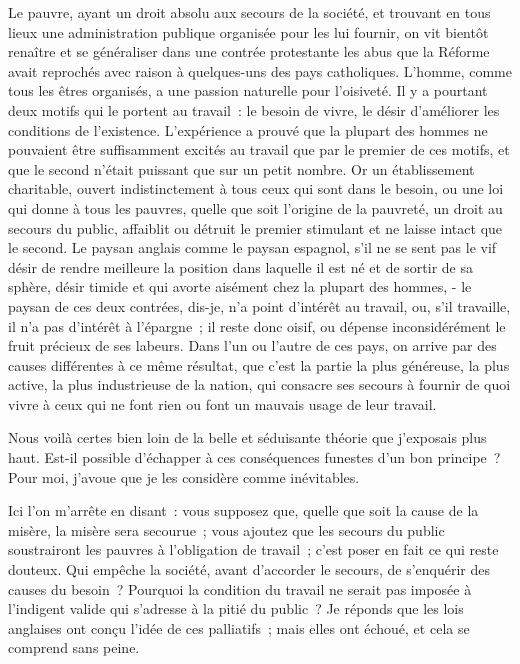 \documentclass[french,twoside]{book} %
\begin{document}
Le pauvre, ayant un droit absolu aux secours de la société, et trouvant en tous lieux une administration publique organisée pour les lui fournir, on vit bientôt renaître et se généraliser dans une contrée protestante les abus que la Réforme avait reprochés avec raison à quelques-uns des pays catholiques. L'homme, comme tous les êtres organisés, a une passion naturelle pour l’oisiveté. Il y a pourtant deux motifs qui le portent au travail : le besoin de vivre, le désir d’améliorer les conditions de l’existence. L’expérience a prouvé que la plupart des hommes ne pouvaient être suffisamment excités au travail que par le premier de ces motifs, et que le second n’était puissant que sur un petit nombre. Or un établissement charitable, ouvert indistinctement à tous ceux qui sont dans le besoin, ou une loi qui donne à tous les pauvres, quelle que soit l’origine de la pauvreté, un droit au secours du public, affaiblit ou détruit le premier stimulant et ne laisse intact que le second. Le paysan anglais comme le paysan espagnol, s’il ne se sent pas le vif désir de rendre meilleure la position dans laquelle il est né et de sortir de sa sphère, désir timide et qui avorte aisément chez la plupart des hommes, - le paysan de ces deux contrées, dis-je, n’a point d’intérêt au travail, ou, s’il travaille, il n’a pas d’intérêt à l’épargne ; il reste donc oisif, ou dépense inconsidérément le fruit précieux de ses labeurs. Dans l’un ou l’autre de ces pays, on arrive par des causes différentes à ce même résultat, que c’est la partie la plus généreuse, la plus active, la plus industrieuse de la nation, qui consacre ses secours à fournir de quoi vivre à ceux qui ne font rien ou font un mauvais usage de leur travail.\par
\bigbreak
\noindent Nous voilà certes bien loin de la belle et séduisante théorie que j’exposais plus haut. Est-il possible d’échapper à ces conséquences funestes d’un bon principe ? Pour moi, j’avoue que je les considère comme inévitables.\par
\bigbreak
\noindent Ici l’on m’arrête en disant : vous supposez que, quelle que soit la cause de la misère, la misère sera secourue ; vous ajoutez que les secours du public soustrairont les pauvres à l’obligation de travail ; c’est poser en fait ce qui reste douteux. Qui empêche la société, avant d’accorder le secours, de s’enquérir des causes du besoin ? Pourquoi la condition du travail ne serait pas imposée à l’indigent valide qui s’adresse à la pitié du public ? Je réponds que les lois anglaises ont conçu l’idée de ces palliatifs ; mais elles ont échoué, et cela se comprend sans peine.\par
\end{document}

